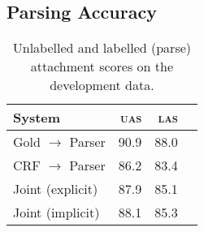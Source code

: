 \documentclass[11pt,letterpaper]{article}
\begin{document}
%
%
%
%
\subsection{Parsing Accuracy}

\begin{table}
    \centering
    \small
    \begin{tabular}{l|rrr}
        \hline
        System & \textsc{uas} & \textsc{las} \\
        \hline \hline
        Gold $\rightarrow$ Parser & 90.9 & 88.0 \\
        \hline
        CRF $\rightarrow$  Parser & 86.2 & 83.4 \\
        Joint (explicit)          & 87.9 & 85.1 \\
        Joint (implicit)          & 88.1 & 85.3 \\
        \hline
    \end{tabular}
    \caption{\small Unlabelled and labelled (parse) attachment scores on the
        development data.
        \label{tab:parse}}
\vspace*{-3em}
\end{table}
\end{document}
